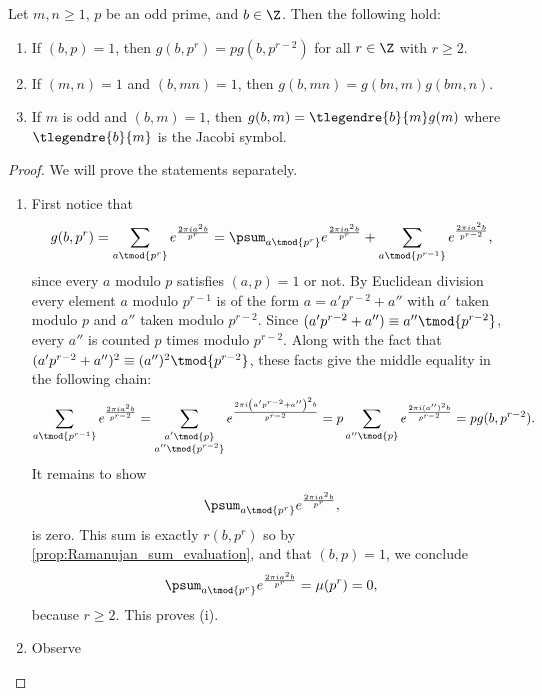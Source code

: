        \begin{proposition}\label{prop:quadratic_Gauss_sum_reduction}
          Let $m,n \ge 1$, $p$ be an odd prime, and $b \in \Z$. Then the following hold:
          \begin{enumerate}[label=(\roman*)]
            \item If $(b,p) = 1$, then $g(b,p^{r}) = pg(b,p^{r-2})$ for all $r \in \Z$ with $r \ge 2$.
            \item If $(m,n) = 1$ and $(b,mn) = 1$, then $g(b,mn) = g(bn,m)g(bm,n)$.
            \item If $m$ is odd and $(b,m) = 1$, then $g(b,m) = \tlegendre{b}{m}g(m)$ where $\tlegendre{b}{m}$ is the Jacobi symbol.
          \end{enumerate}
        \end{proposition}
        \begin{proof}
          We will prove the statements separately.
          \begin{enumerate}[label=(\roman*)]
            \item First notice that
            \[
              g(b,p^{r}) = \sum_{a \tmod{p^{r}}}e^{\frac{2\pi ia^{2}b}{p^{r}}} = \psum_{a \tmod{p^{r}}}e^{\frac{2\pi ia^{2}b}{p^{r}}}+\sum_{a \tmod{p^{r-1}}}e^{\frac{2\pi ia^{2}b}{p^{r-2}}},
            \]
            since every $a$ modulo $p$ satisfies $(a,p) = 1$ or not. By Euclidean division every element $a$ modulo $p^{r-1}$ is of the form $a = a'p^{r-2}+a''$ with $a'$ taken modulo $p$ and $a''$ taken modulo $p^{r-2}$. Since $(a'p^{r-2}+a'') \equiv a'' \tmod{p^{r-2}}$, every $a''$ is counted $p$ times modulo $p^{r-2}$. Along with the fact that $(a'p^{r-2}+a'')^{2} \equiv (a'')^{2} \tmod{p^{r-2}}$, these facts give the middle equality in the following chain:
            \[
              \sum_{a \tmod{p^{r-1}}}e^{\frac{2\pi ia^{2}b}{p^{r-2}}} = \sum_{\substack{a' \tmod{p} \\ a'' \tmod{p^{r-2}}}}e^{\frac{2\pi i\left(a'p^{r-2}+a''\right)^{2}b}{p^{r-2}}} = p\sum_{a'' \tmod{p}}e^{\frac{2\pi i(a'')^{2}b}{p^{r-2}}} = pg(b,p^{r-2}).
            \]
            It remains to show
            \[
              \psum_{a \tmod{p^{r}}}e^{\frac{2\pi ia^{2}b}{p^{r}}},
            \]
            is zero. This sum is exactly $r(b,p^{r})$ so by \cref{prop:Ramanujan_sum_evaluation}, and that $(b,p) = 1$, we conclude
            \[
              \psum_{a \tmod{p^{r}}}e^{\frac{2\pi ia^{2}b}{p^{r}}} = \mu(p^{r}) = 0,
            \]
            because $r \ge 2$. This proves (i).
            \item Observe

\end{enumerate}
\end{proof}
